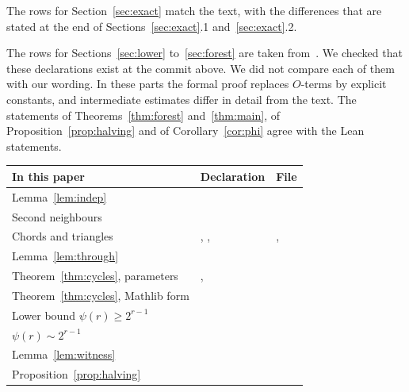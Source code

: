 The rows for Section~\ref{sec:exact} match the text, with the differences that are stated at the
end of Sections~\ref{sec:exact}.1 and~\ref{sec:exact}.2.

The rows for Sections~\ref{sec:lower} to~\ref{sec:forest} are taken from~\cite[Appendix~A]{KNT}. We
checked that these declarations exist at the commit above. We did not compare each of them with our
wording. In these parts the formal proof replaces $O$-terms by explicit constants, and intermediate
estimates differ in detail from the text. The statements of Theorems~\ref{thm:forest}
and~\ref{thm:main}, of Proposition~\ref{prop:halving} and of Corollary~\ref{cor:phi} agree with
the Lean statements.

\begin{center}\begin{minipage}{\linewidth}\centering\small
{}\label{tab:steps}
\smallskip
\renewcommand{\arraystretch}{1.0}
\begin{tabular}{@{}L{3.7cm}L{6.3cm}L{5.6cm}@{}}
\toprule
In this paper & Declaration & File \\
\midrule
Lemma~\ref{lem:indep} &  &  \\
Second neighbours &  &  \\
Chords and triangles & , , 
  & ,  \\
Lemma~\ref{lem:through} &  &  \\
Theorem~\ref{thm:cycles}, parameters & ,
   &  \\
Theorem~\ref{thm:cycles}, Mathlib form &  &
   \\
Lower bound $\psi(r)\ge2^{r-1}$ &  &  \\
$\psi(r)\sim2^{r-1}$ &  &  \\
\midrule
Lemma~\ref{lem:witness} &  &  \\
Proposition~\ref{prop:halving} &  &

\end{tabular}
\end{minipage}
\end{center}
